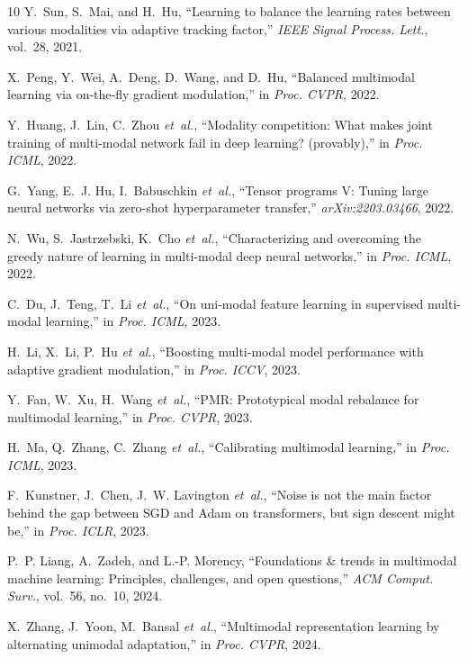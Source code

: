 \documentclass[conference]{IEEEtran}
\begin{document}
\begin{thebibliography}{10}
Y.~Sun, S.~Mai, and H.~Hu, ``Learning to balance the learning rates between various modalities via adaptive tracking factor,'' \emph{IEEE Signal Process. Lett.}, vol.~28, 2021.

X.~Peng, Y.~Wei, A.~Deng, D.~Wang, and D.~Hu, ``Balanced multimodal learning via on-the-fly gradient modulation,'' in \emph{Proc. CVPR}, 2022.

Y.~Huang, J.~Lin, C.~Zhou \emph{et~al.}, ``Modality competition: What makes joint training of multi-modal network fail in deep learning? (provably),'' in \emph{Proc. ICML}, 2022.

G.~Yang, E.~J. Hu, I.~Babuschkin \emph{et~al.}, ``Tensor programs {V}: Tuning large neural networks via zero-shot hyperparameter transfer,'' \emph{arXiv:2203.03466}, 2022.

N.~Wu, S.~Jastrzebski, K.~Cho \emph{et~al.}, ``Characterizing and overcoming the greedy nature of learning in multi-modal deep neural networks,'' in \emph{Proc. ICML}, 2022.

C.~Du, J.~Teng, T.~Li \emph{et~al.}, ``On uni-modal feature learning in supervised multi-modal learning,'' in \emph{Proc. ICML}, 2023.

H.~Li, X.~Li, P.~Hu \emph{et~al.}, ``Boosting multi-modal model performance with adaptive gradient modulation,'' in \emph{Proc. ICCV}, 2023.

Y.~Fan, W.~Xu, H.~Wang \emph{et~al.}, ``{PMR}: Prototypical modal rebalance for multimodal learning,'' in \emph{Proc. CVPR}, 2023.

H.~Ma, Q.~Zhang, C.~Zhang \emph{et~al.}, ``Calibrating multimodal learning,'' in \emph{Proc. ICML}, 2023.

F.~Kunstner, J.~Chen, J.~W. Lavington \emph{et~al.}, ``Noise is not the main factor behind the gap between {SGD} and {Adam} on transformers, but sign descent might be,'' in \emph{Proc. ICLR}, 2023.

P.~P. Liang, A.~Zadeh, and L.-P. Morency, ``Foundations {\&} trends in multimodal machine learning: Principles, challenges, and open questions,'' \emph{ACM Comput. Surv.}, vol.~56, no.~10, 2024.

X.~Zhang, J.~Yoon, M.~Bansal \emph{et~al.}, ``Multimodal representation learning by alternating unimodal adaptation,'' in \emph{Proc. CVPR}, 2024.


\end{thebibliography}
\end{document}

